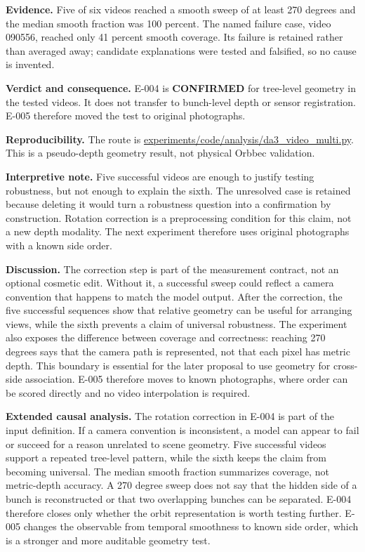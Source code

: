 \documentclass[preprint,12pt]{elsarticle}
\newcommand{\pathcode}[1]{\scriptsize\url{#1}}
\begin{document}
\textbf{Evidence.} Five of six videos reached a smooth sweep of at least
270 degrees and the median smooth fraction was 100 percent. The named failure
case, video 090556, reached only 41 percent smooth coverage. Its failure is
retained rather than averaged away; candidate explanations were tested and
falsified, so no cause is invented.

\textbf{Verdict and consequence.} E-004 is \textbf{CONFIRMED} for tree-level
geometry in the tested videos. It does not transfer to bunch-level depth or
sensor registration. E-005 therefore moved the test to original photographs.

\textbf{Reproducibility.} The route is
\pathcode{experiments/code/analysis/da3_video_multi.py}. This is a
pseudo-depth geometry result, not physical Orbbec validation.

\textbf{Interpretive note.} Five successful videos are enough to justify
testing robustness, but not enough to explain the sixth. The unresolved case
is retained because deleting it would turn a robustness question into a
confirmation by construction. Rotation correction is a preprocessing
condition for this claim, not a new depth modality. The next experiment
therefore uses original photographs with a known side order.

\textbf{Discussion.} The correction step is part of the measurement contract,
not an optional cosmetic edit. Without it, a successful sweep could
reflect a camera convention that happens to match the model output. After the
correction, the five successful sequences show that relative geometry can be
useful for arranging views, while the sixth prevents a claim of universal
robustness. The experiment also exposes the difference between coverage and
correctness: reaching 270 degrees says that the camera path is represented,
not that each pixel has metric depth. This boundary is essential for the
later proposal to use geometry for cross-side association. E-005 therefore
moves to known photographs, where order can be scored directly and no video
interpolation is required.

\textbf{Extended causal analysis.} The rotation correction in E-004 is part
of the input definition. If a camera convention is inconsistent, a model can
appear to fail or succeed for a reason unrelated to scene geometry. Five
successful videos support a repeated tree-level pattern, while the sixth keeps
the claim from becoming universal. The median smooth fraction summarizes
coverage, not metric-depth accuracy. A 270 degree sweep does not say that the
hidden side of a bunch is reconstructed or that two overlapping bunches can be
separated. E-004 therefore closes only whether the orbit representation is
worth testing further. E-005 changes the observable from temporal smoothness
to known side order, which is a stronger and more auditable geometry test.
\end{document}
